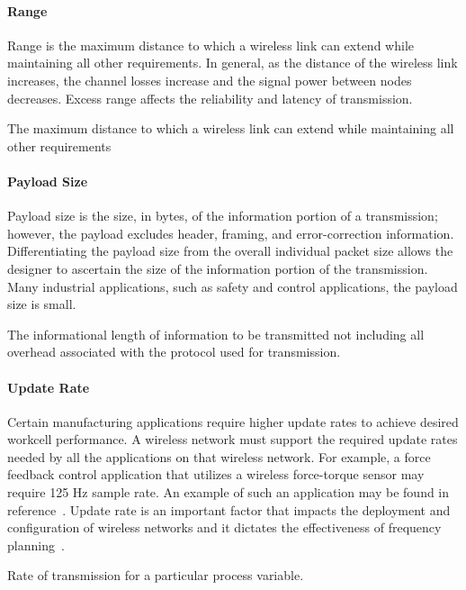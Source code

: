 \paragraph{Range}
Range is the maximum distance to which a wireless link can extend while maintaining all other requirements. In general, as the distance of the wireless link increases, the channel losses increase and the signal power between nodes decreases. Excess range affects the reliability and latency of transmission.
\begin{definition}[Range] \label{def:range}
	The maximum distance to which a wireless link can extend while maintaining all other requirements
\end{definition}

\paragraph{Payload Size}
Payload size is the size, in bytes, of the information portion of a transmission; however, the payload excludes header, framing, and error-correction information. Differentiating the payload size from the overall individual packet size allows the designer to ascertain the size of the information portion of the transmission. Many industrial applications, such as safety and control applications, the payload size is small.
\begin{definition} \label{def:payloadsize}
	The informational length of information to be transmitted not including all overhead associated with the protocol used for transmission.
\end{definition}

\paragraph{Update Rate}
Certain manufacturing applications require higher update rates to achieve desired workcell performance. A wireless network must support the required update rates needed by all the applications on that wireless network. For example, a force feedback control application that utilizes a wireless force-torque sensor may require 125 Hz sample rate. An example of such an application may be found in reference~\cite{Candell_ISIT_2019}. Update rate is an important factor that impacts the deployment and configuration of wireless networks and it dictates the effectiveness of frequency planning~\cite{Candell2018.IWSGuide}.
\begin{definition} \label{def:updaterate}
	Rate of transmission for a particular process variable.
\end{definition}

